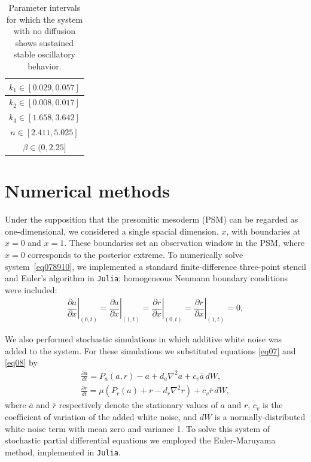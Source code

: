 \documentclass[11pt]{article}
\begin{document}
	\begin{table}[h] 
		\centering
		\begin{tabular}{|c|} \hline
			$k_1  \in [0.029, 0.057]$ \\ \hline
			$k_2  \in [0.008, 0.017]$ \\ \hline 
			$k_3  \in [1.658, 3.642]$ \\ \hline
			$n  \in  [2.411, 5.025]$ \\  \hline
			$\beta  \in  (0, 2.25]$ \\   \hline
		\end{tabular} 
		
		\caption{Parameter intervals for which the system with no diffusion shows
			sustained stable oscillatory behavior.}
		\label{Tab01}
	\end{table}
	
	\section{Numerical methods}
	\label{numer}
	
	Under the supposition that the presomitic mesoderm (PSM) can be regarded as
	one-dimensional, we considered a single spacial dimension, $x$, with boundaries
	at $x=0$ and $x=1$. These boundaries set an observation window in the PSM, where
	$x=0$ corresponds to the posterior extreme. To numerically solve
	system~\eqref{eq078910}, we implemented a standard finite-difference three-point
	stencil and Euler's algorithm in \texttt{Julia}; homogeneous Neumann boundary
	conditions were included:
	\begin{gather}\label{eqbn}
	\left. \dfrac{\partial a}{\partial x}\right|_{(0, t)} = 
	\left. \dfrac{\partial a}{\partial x}\right|_{(1, t)} = 
	\left. \dfrac{\partial r}{\partial x}\right|_{(0, t)} =
	\left. \dfrac{\partial r}{\partial x}\right|_{(1, t)} = 0 ,
	\end{gather}
		
	We also performed stochastic simulations in which additive white noise was added
	to the system. For these simulations we substituted equations \eqref{eq07} and
	\eqref{eq08} by
	\begin{subequations}\label{eq1112}
		\begin{gather}
		\frac{\partial a}{dt} = P_a(a, r) - a + d_a \nabla^2 a + c_v \overline{a} \,
		dW, \label{eq11} \\
		\frac{\partial r}{dt}= \mu (P_r(a) + r - d_r \nabla^2 r) + c_v \overline{r} \,
		dW, \label{eq12}
		\end{gather}
	\end{subequations}
	where $\overline{a}$ and $\overline{r}$ respectively denote the stationary
	values of  $a$ and $r$, $c_v$ is the coefficient of variation of the added white
	noise, and $dW$ is a normally-distributed white noise term with mean zero and
	variance 1. To solve this system of stochastic partial differential equations we
	employed the Euler-Maruyama method, implemented in \texttt{Julia}.
	
\end{document}
